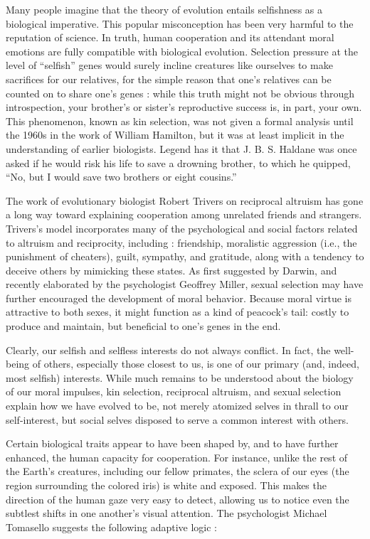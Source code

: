 \documentclass[a4paper,14pt]{extarticle}
\begin{document}
Many people imagine that the theory of evolution entails selfishness as a biological imperative.
This popular misconception has been very harmful to the reputation of science.
In truth, human cooperation and its attendant moral emotions are fully compatible with biological evolution.
Selection pressure at the level of ``selfish'' genes would surely incline creatures like ourselves to make sacrifices for our relatives, for the simple reason that one's relatives can be counted on to share one's genes :
while this truth might not be obvious through introspection, your brother's or sister's reproductive success is, in part, your own.
This phenomenon, known as kin selection, was not given a formal analysis until the 1960s in the work of William Hamilton, but it was at least implicit in the understanding of earlier biologists.
Legend has it that J. B. S. Haldane was once asked if he would risk his life to save a drowning brother, to which he quipped, ``No, but I would save two brothers or eight cousins.''

The work of evolutionary biologist Robert Trivers on reciprocal altruism has gone a long way toward explaining cooperation among unrelated friends and strangers.
Trivers's model incorporates many of the psychological and social factors related to altruism and reciprocity, including :
friendship, moralistic aggression (i.e., the punishment of cheaters), guilt, sympathy, and gratitude, along with a tendency to deceive others by mimicking these states.
As first suggested by Darwin, and recently elaborated by the psychologist Geoffrey Miller, sexual selection may have further encouraged the development of moral behavior.
Because moral virtue is attractive to both sexes, it might function as a kind of peacock's tail:
costly to produce and maintain, but beneficial to one's genes in the end.

Clearly, our selfish and selfless interests do not always conflict.
In fact, the well-being of others, especially those closest to us, is one of our primary (and, indeed, most selfish) interests.
While much remains to be understood about the biology of our moral impulses, kin selection, reciprocal altruism, and sexual selection explain how we have evolved to be, not merely atomized selves in thrall to our self-interest, but social selves disposed to serve a common interest with others.

Certain biological traits appear to have been shaped by, and to have further enhanced, the human capacity for cooperation.
For instance, unlike the rest of the Earth's creatures, including our fellow primates, the sclera of our eyes (the region surrounding the colored iris) is white and exposed.
This makes the direction of the human gaze very easy to detect, allowing us to notice even the subtlest shifts in one another's visual attention.
The psychologist Michael Tomasello suggests the following adaptive logic :
\end{document}
